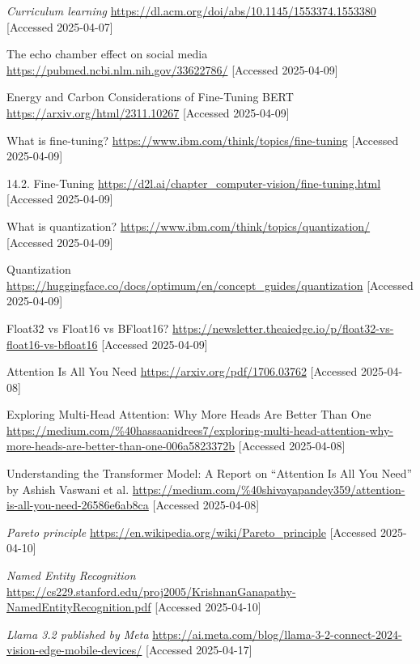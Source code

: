 \documentclass[licencjacka,en]{pracamgr}
\begin{document}
\begin{thebibliography}{99}
\textit{Curriculum learning}
\url{https://dl.acm.org/doi/abs/10.1145/1553374.1553380}
[Accessed 2025-04-07]

The echo chamber effect on social media
\url{https://pubmed.ncbi.nlm.nih.gov/33622786/}
[Accessed 2025-04-09]

Energy and Carbon Considerations of Fine-Tuning BERT
\url{https://arxiv.org/html/2311.10267}
[Accessed 2025-04-09]

What is fine-tuning?
\url{https://www.ibm.com/think/topics/fine-tuning}
[Accessed 2025-04-09]

14.2. Fine-Tuning
\url{https://d2l.ai/chapter_computer-vision/fine-tuning.html}
[Accessed 2025-04-09]

What is quantization?
\url{https://www.ibm.com/think/topics/quantization/}
[Accessed 2025-04-09]

Quantization
\url{https://huggingface.co/docs/optimum/en/concept_guides/quantization}
[Accessed 2025-04-09]

Float32 vs Float16 vs BFloat16?
\url{https://newsletter.theaiedge.io/p/float32-vs-float16-vs-bfloat16}
[Accessed 2025-04-09]

Attention Is All You Need
\url{https://arxiv.org/pdf/1706.03762} 
[Accessed 2025-04-08]

Exploring Multi-Head Attention: Why More Heads Are Better Than One
\url{https://medium.com/%40hassaanidrees7/exploring-multi-head-attention-why-more-heads-are-better-than-one-006a5823372b}
[Accessed 2025-04-08]

Understanding the Transformer Model: A Report on “Attention Is All You Need” by Ashish Vaswani et al.
\url{https://medium.com/%40shivayapandey359/attention-is-all-you-need-26586e6ab8ca}
[Accessed 2025-04-08]

\textit{Pareto principle}
\url{https://en.wikipedia.org/wiki/Pareto_principle}
[Accessed 2025-04-10]

\textit{Named Entity Recognition}
\url{https://cs229.stanford.edu/proj2005/KrishnanGanapathy-NamedEntityRecognition.pdf}
[Accessed 2025-04-10]

\textit{Llama 3.2 published by Meta}
\url{https://ai.meta.com/blog/llama-3-2-connect-2024-vision-edge-mobile-devices/}
[Accessed 2025-04-17]


\end{thebibliography}
\end{document}
